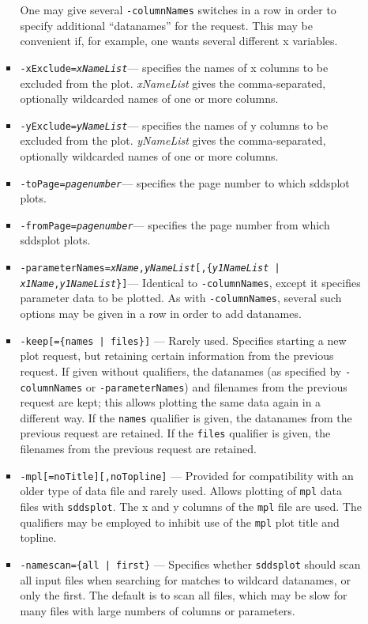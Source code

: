 \begin{itemize}
\begin{itemize}
\begin{itemize}
        One may give several {\tt -columnNames} switches in a row in order to specify additional ``datanames'' for
        the request.  This may be convenient if, for example, one wants several different x variables.
  \item {\tt -xExclude={\em xNameList}}---
        specifies the names of x columns to be excluded from the plot. 
        {\em xNameList} gives the comma-separated, optionally wildcarded names of one or more columns.
  \item {\tt -yExclude={\em yNameList}}---
        specifies the names of y columns to be excluded from the plot. 
        {\em yNameList} gives the comma-separated, optionally wildcarded names of one or more columns.
  \item {\tt -toPage={\em pagenumber}}---
        specifies the page number to which sddsplot plots.
  \item {\tt -fromPage={\em pagenumber}}---
        specifies the page number from which sddsplot plots.      
  \item {\tt -parameterNames={\em xName},{\em yNameList}[,\{{\em y1NameList} | {\em x1Name},{\em y1NameList}\}]}---
        Identical to {\tt -columnNames}, except it specifies parameter data to be plotted.  As with {\tt -columnNames},
        several such options may be given in a row in order to add datanames.

  \item {\tt -keep[=\{names | files\}]} ---
        Rarely used.
        Specifies starting a new plot request, but retaining certain information from the previous request.
        If given without qualifiers, the datanames (as specified by {\tt -columnNames} or {\tt -parameterNames})
        and filenames from the previous request are kept; this allows plotting the same data again in a different
        way.  If the {\tt names} qualifier is given, the datanames from the previous request are retained.
        If the {\tt files} qualifier is given, the filenames from the previous request are retained.

  \item {\tt -mpl[=noTitle][,noTopline]} ---
        Provided for compatibility with an older type of data file and rarely used.
        Allows plotting of {\tt mpl} data files with {\tt sddsplot}.  The x and y columns of the {\tt mpl} file
        are used.  The qualifiers may be employed to inhibit use of the {\tt mpl} plot title and topline.

  \item {\tt -namescan=\{all | first\}} --- Specifies whether {\tt sddsplot} should scan all input files when searching
        for matches to wildcard datanames, or only the first.  The default is to scan all files, which may be slow
        for many files with large numbers of columns or parameters.
  \end{itemize}
   

\end{itemize}
\end{itemize}
